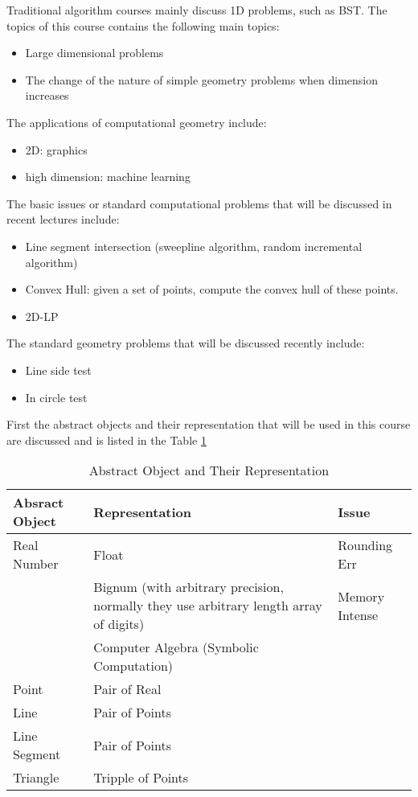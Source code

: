 \documentclass[12pt]{article}
\newcommand{\tref}[1]{Table \ref{#1}}
\begin{document}
Traditional algorithm courses mainly discuss 1D problems, such as
BST. The topics of this course contains the following main topics:
\begin{itemize}
\item Large dimensional problems
\item The change of the nature of simple geometry problems when
  dimension increases
\end{itemize}
The applications of computational geometry include:
\begin{itemize}
\item 2D: graphics
\item high dimension: machine learning
\end{itemize}
The basic issues or standard computational problems that will be
discussed in recent lectures include:
\begin{itemize}
\item Line segment intersection (sweepline algorithm, random
  incremental algorithm)
\item Convex Hull: given a set of points, compute the convex hull of
  these points.
\item 2D-LP
\end{itemize}
The standard geometry problems that will be discussed recently
include:
\begin{itemize}
\item Line side test
\item In circle test
\end{itemize}
First the abstract objects and their representation that will be used
in this course are discussed and is listed in the \tref{tab:AO}
\begin{table}[h!]
\centering
\caption{Abstract Object and Their Representation}
\label{tab:AO}
\begin{tabular}{@{}l p{5cm}l@{}}
\toprule
Absract Object & Representation                                                                        & Issue          \\ \midrule
Real Number    & Float                                                                                 & Rounding Err   \\
               & Bignum (with arbitrary precision, normally they use arbitrary length array of digits) & Memory Intense \\
               & Computer Algebra (Symbolic Computation)                                               &                \\
Point          & Pair of Real                                                                          &                \\
Line           & Pair of Points                                                                        &                \\
Line Segment   & Pair of Points                                                                        &                \\
Triangle       & Tripple of Points                                                                     &                \\ \bottomrule
\end{tabular}
\end{table}
\end{document}
